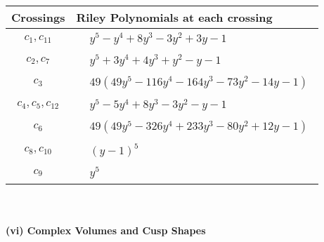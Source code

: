 \documentclass[1p]{elsarticle_modified}
\theoremstyle{definition}
\begin{document}
\begin{tabular}{m{50pt}|m{274pt}}
Crossings & \hspace{64pt}Riley Polynomials at each crossing \\
\hline $$\begin{aligned}c_{1},c_{11}\end{aligned}$$&$\begin{aligned}
&y^5- y^4+8 y^3-3 y^2+3 y-1
\end{aligned}$\\
\hline $$\begin{aligned}c_{2},c_{7}\end{aligned}$$&$\begin{aligned}
&y^5+3 y^4+4 y^3+y^2- y-1
\end{aligned}$\\
\hline $$\begin{aligned}c_{3}\end{aligned}$$&$\begin{aligned}
&49(49 y^5-116 y^4-164 y^3-73 y^2-14 y-1)
\end{aligned}$\\
\hline $$\begin{aligned}c_{4},c_{5},c_{12}\end{aligned}$$&$\begin{aligned}
&y^5-5 y^4+8 y^3-3 y^2- y-1
\end{aligned}$\\
\hline $$\begin{aligned}c_{6}\end{aligned}$$&$\begin{aligned}
&49(49 y^5-326 y^4+233 y^3-80 y^2+12 y-1)
\end{aligned}$\\
\hline $$\begin{aligned}c_{8},c_{10}\end{aligned}$$&$\begin{aligned}
&(y-1)^5
\end{aligned}$\\
\hline $$\begin{aligned}c_{9}\end{aligned}$$&$\begin{aligned}
&y^5
\end{aligned}$\\
\hline
\end{tabular}\\~\\
\newpage\flushleft \textbf{(vi) Complex Volumes and Cusp Shapes}
\end{document}
